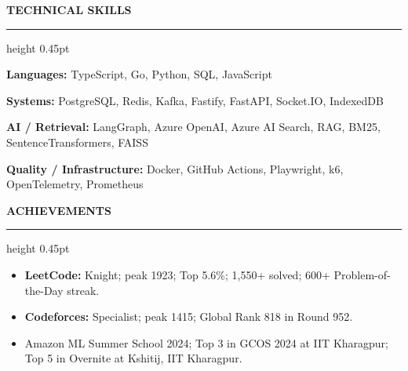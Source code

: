 \documentclass[10pt,a4paper]{article}
\newcommand{\resumesection}[1]{%
  \vspace{4.2pt}%
  {\color{accent}\fontsize{11.2pt}{12pt}\selectfont\bfseries\MakeUppercase{#1}}%
  \vspace{1.4pt}\par%
  {\color{rule}\hrule height 0.45pt}%
  \vspace{2.8pt}%
}
\newenvironment{resumeitems}{%
  \begin{itemize}[
    leftmargin=12pt,
    labelsep=4.2pt,
    itemsep=0.8pt,
    parsep=0pt,
    topsep=1.2pt,
    partopsep=0pt
  ]%
}{%
  \end{itemize}%
}
\begin{document}
\resumesection{Technical Skills}
\textbf{Languages:} TypeScript, Go, Python, SQL, JavaScript\par
\textbf{Systems:} PostgreSQL, Redis, Kafka, Fastify, FastAPI, Socket.IO, IndexedDB\par
\textbf{AI / Retrieval:} LangGraph, Azure OpenAI, Azure AI Search, RAG, BM25, SentenceTransformers, FAISS\par
\textbf{Quality / Infrastructure:} Docker, GitHub Actions, Playwright, k6, OpenTelemetry, Prometheus\par

\resumesection{Achievements}
\begin{resumeitems}
  \item \textbf{LeetCode:} Knight; peak 1923; Top 5.6\%; 1,550+ solved; 600+ Problem-of-the-Day streak.
  \item \textbf{Codeforces:} Specialist; peak 1415; Global Rank 818 in Round 952.
  \item Amazon ML Summer School 2024; Top 3 in GCOS 2024 at IIT Kharagpur; Top 5 in Overnite at Kshitij, IIT Kharagpur.
\end{resumeitems}
\end{document}
